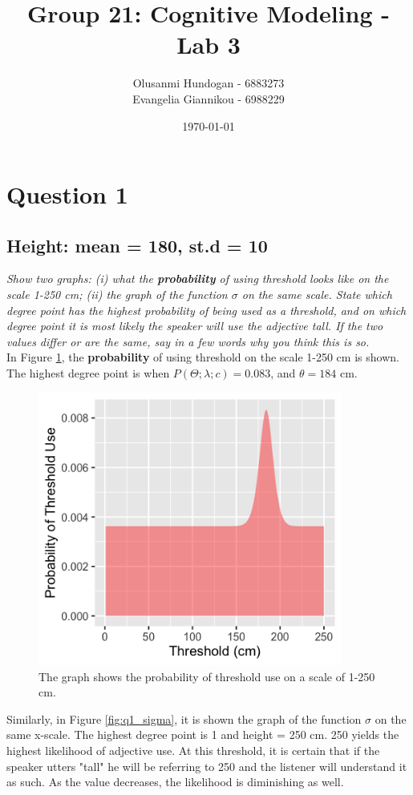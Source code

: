 \documentclass[11pt,a4paper,oneside]{article}
\title{\textbf{Group 21: Cognitive Modeling - Lab 3}}
\date{\today}
\author{Olusanmi Hundogan - 6883273\\
Evangelia Giannikou - 6988229\\
}
\begin{document}
\maketitle

\section{Question 1}
\label{Q1}
\subsection{Height: mean = 180, st.d = 10}
\textit{Show two graphs: (i) what the \textbf{probability} of using threshold looks like on the scale 1-250 cm; (ii) the graph of the function $\sigma$ on the same scale. State which degree point has the highest probability of being used as a threshold, and on which degree point it is most likely the speaker will use the adjective tall. If the two values differ or are the same, say in a few words why you think this is so.}\\

In Figure \ref{fig:q1_threshold}, the \textbf{probability} of using threshold on the scale 1-250 cm is shown. The highest degree point is when $ P(\Theta; \lambda; c) = 0.083$, and $\theta = 184$ cm.

\begin{figure}[H]
    \centering
    \includegraphics[width=100mm]{figs/Question_1_threshold.png}
    \caption{The graph shows the probability of threshold use on a scale of 1-250 cm.}
  \label{fig:q1_threshold}
\end{figure}

Similarly, in Figure \ref{fig:q1_sigma}, it is shown the graph of the function $\sigma$ on the same x-scale. The highest degree point is 1 and height = 250 cm. 250 yields the highest likelihood of adjective use. At this threshold, it is certain that if the speaker utters "tall" he will be referring to 250 and the listener will understand it as such. As the value decreases, the likelihood is diminishing as well.
\end{document}
